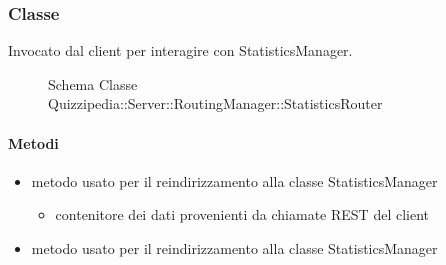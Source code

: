 \subsubsection{Classe }
Invocato dal client per interagire con StatisticsManager.
\begin{figure}[H]
\centering
\noindent{}
\caption[Schema Classe StatisticsRouter]{Schema Classe Quizzipedia::Server::RoutingManager::StatisticsRouter}
\end{figure}
\paragraph{Metodi}
\begin{itemize}
\item {}
\newline
metodo usato per il reindirizzamento alla classe StatisticsManager
\newline
{}
\newline
\begin{itemize}
\item {}
\newline
contenitore dei dati provenienti da chiamate REST del client
\end{itemize}
\item {}
\newline
metodo usato per il reindirizzamento alla classe StatisticsManager
\newline
\end{itemize}
